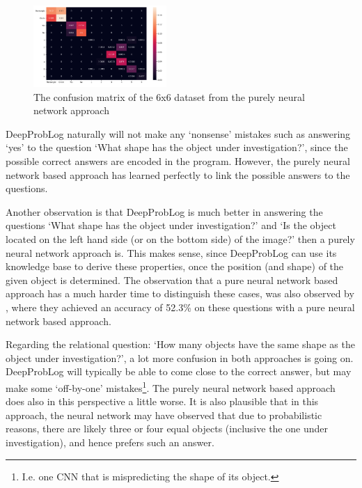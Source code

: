 \documentclass[english]{sobraep}
\begin{document}
\begin{figure}[htp]
    \begin{center}
    \includegraphics[width=0.45\textwidth]{confusion_matrix_6x6_pure_NN.png} 
    \captionsetup{justification=centering}
    \caption{The confusion matrix of the 6x6 dataset from the purely neural network approach}
    \label{fig:confusion_matrix_6x6_pure_nn}
    \end{center}
\end{figure}

DeepProbLog naturally will not make any `nonsense' mistakes such as answering `yes' to the question `What shape has the object under investigation?', since the possible correct answers are encoded in the program. However, the purely neural network based approach has learned perfectly to link the possible answers to the questions.

Another observation is that DeepProbLog is much better in answering the questions `What shape has the object under investigation?' and `Is the object located on the left hand side (or on the bottom side) of the image?' then a purely neural network approach is. This makes sense, since DeepProbLog can use its knowledge base to derive these properties, once the position (and shape) of the given object is determined. The observation that a pure neural network based approach has a much harder time to distinguish these cases, was also observed by \cite{sort_of_clevr_dataset}, where they achieved an accuracy of 52.3\% on these questions with a pure neural network based approach.

Regarding the relational question: `How many objects have the same shape as the object under investigation?', a lot more confusion in both approaches is going on. DeepProbLog will typically be able to come close to the correct answer, but may make some `off-by-one' mistakes\footnote{I.e. one CNN that is mispredicting the shape of its object.}. The purely neural network based approach does also in this perspective a little worse. It is also plausible that in this approach, the neural network may have observed that due to probabilistic reasons, there are likely three or four equal objects (inclusive the one under investigation), and hence prefers such an answer.
\end{document}
